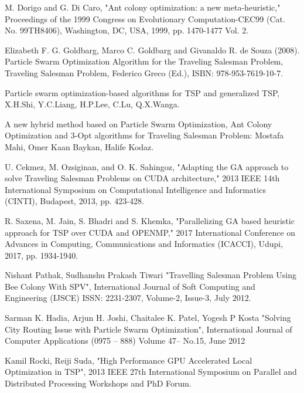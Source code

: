 \documentclass[conference]{IEEEtran}
\begin{document}
\begin{thebibliography}{00}
 M. Dorigo and G. Di Caro, "Ant colony optimization: a new meta-heuristic," Proceedings of the 1999 Congress on Evolutionary Computation-CEC99 (Cat. No. 99TH8406), Washington, DC, USA, 1999, pp. 1470-1477 Vol. 2.

 Elizabeth F. G. Goldbarg, Marco C. Goldbarg and Givanaldo R. de Souza (2008). Particle Swarm Optimization Algorithm for the Traveling Salesman Problem, Traveling Salesman Problem, Federico Greco (Ed.), ISBN: 978-953-7619-10-7.

 Particle swarm optimization-based algorithms for TSP and generalized TSP, X.H.Shi, Y.C.Liang, H.P.Lee, C.Lu, Q.X.Wanga.

 A new hybrid method based on Particle Swarm Optimization, Ant Colony Optimization and 3-Opt algorithms for Traveling Salesman Problem: Mostafa Mahi, Omer Kaan Baykan, Halife Kodaz.

 U. Cekmez, M. Ozsiginan, and O. K. Sahingoz, "Adapting the GA approach to solve Traveling Salesman Problems on CUDA architecture," 2013 IEEE 14th International Symposium on Computational Intelligence and Informatics (CINTI), Budapest, 2013, pp. 423-428.

 R. Saxena, M. Jain, S. Bhadri and S. Khemka, "Parallelizing GA based heuristic approach for TSP over CUDA and OPENMP," 2017 International Conference on Advances in Computing, Communications and Informatics (ICACCI), Udupi, 2017, pp. 1934-1940.

 Nishant Pathak, Sudhanshu Prakash Tiwari "Travelling Salesman Problem Using Bee Colony With SPV", International Journal of Soft Computing and Engineering (IJSCE) ISSN: 2231-2307, Volume-2, Issue-3, July 2012.

 Sarman K. Hadia, Arjun H. Joshi, Chaitalee K. Patel, Yogesh P Kosta "Solving City Routing Issue with Particle Swarm Optimization", International Journal of Computer Applications (0975 – 888) Volume 47– No.15, June 2012

 Kamil Rocki, Reiji Suda, "High Performance GPU Accelerated Local Optimization in TSP", 2013 IEEE 27th International Symposium on Parallel and Distributed Processing Workshops and PhD Forum.



\end{thebibliography}
\end{document}
